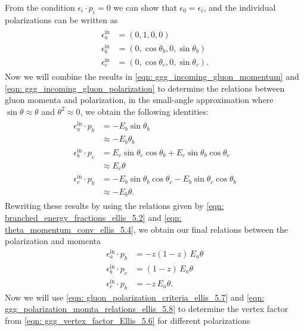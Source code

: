\documentclass[main.tex]{subfiles}
\begin{document}
From the condition \(\epsilon_i \cdot p_i =0\) we can show that \(\epsilon_0 = \epsilon_i\), 
and the individual polarizations can be written as
\begin{align}\label{eqn: ggg_incoming_gluon_polarization}
    \begin{split}
    \epsilon^{\text{in}}_a &= \left( 0, 1, 0, 0\right)  \\
    \epsilon^{\text{in}}_b &= \left( 0, \cos \theta_b, 0, \sin \theta_b \right) \\
    \epsilon^{\text{in}}_c &= \left( 0, \cos \theta_c, 0, \sin \theta_c \right).
    \end{split}
\end{align}
Now we will combine the results in \autoref{eqn: ggg_incoming_gluon_momentum} and \autoref{eqn: ggg_incoming_gluon_polarization} to determine the relations between gluon momenta and polarization, in the small-angle approximation where \(\sin \theta \approx \theta\) and \(\theta^2 \approx 0\), we obtain the following identities:
\begin{align}
    \begin{split}
    \epsilon^{\text{in}}_a \cdot p_b &= -E_b \sin \theta_b\\
        &\approx -E_b \theta_b \\
    \epsilon^{\text{in}}_b \cdot p_c &= E_c \sin \theta_c \cos \theta_b + E_c \sin \theta_b \cos \theta_c \\
    &\approx E_c \theta \\
    \epsilon^{\text{in}}_c \cdot p_b &= -E_b \sin \theta_b \cos \theta_c - E_b \sin \theta_c \cos \theta_b \\
    &\approx -E_b \theta.
    \end{split}
\end{align}
Rewriting these results by using the relations given by \autoref{eqn: branched_energy_fractions_ellis_5.2} and \autoref{eqn: theta_momentum_conv_ellis_5.4}, we obtain our final relations between the polarization and momenta
\begin{align}\label{eqn: ggg_polarization_momta_relations_ellis_5.8}
    \epsilon^{\text{in}}_a \cdot p_b &= -z(1-z)\, E_a \theta \nonumber \\
    \epsilon^{\text{in}}_b \cdot p_c &= (1-z)\, E_a \theta\\
    \epsilon^{\text{in}}_c \cdot p_b &= -z\, E_a \theta. \nonumber
\end{align}
Now we will use \autoref{eqn: gluon_polarization_criteria_ellis_5.7} and \autoref{eqn: ggg_polarization_momta_relations_ellis_5.8} to determine the vertex factor from \autoref{eqn: ggg_vertex_factor_Ellis_5.6} for different polarizations 
\end{document}
